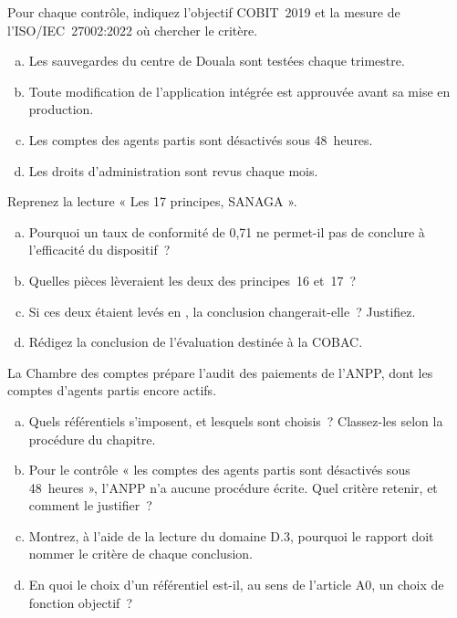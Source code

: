 \bigskip

\begin{boxexo}[title={\ding{45}\quad Exercice~11.1. Trouver le critère \niveaubase}]
Pour chaque contrôle, indiquez l'objectif COBIT~2019 et la mesure de
l'ISO/IEC~27002:2022 où chercher le critère.
\begin{enumerate}[(a)]
    \item Les sauvegardes du centre de Douala sont testées chaque trimestre.
    \item Toute modification de l'application intégrée est approuvée avant
          sa mise en production.
    \item Les comptes des agents partis sont désactivés sous 48~heures.
    \item Les droits d'administration sont revus chaque mois.
\end{enumerate}
\end{boxexo}

\begin{boxexo}[title={\ding{45}\quad Exercice~11.2. Conclure selon le COSO \niveaumoyen}]
Reprenez la lecture « Les 17 principes, SANAGA ».
\begin{enumerate}[(a)]
    \item Pourquoi un taux de conformité de 0,71 ne permet-il pas de
          conclure à l'efficacité du dispositif~?
    \item Quelles pièces lèveraient les deux \NEK{} des principes~16 et~17~?
    \item Si ces deux \NEK{} étaient levés en \OUI{}, la conclusion
          changerait-elle~? Justifiez.
    \item Rédigez la conclusion de l'évaluation destinée à la COBAC.
\end{enumerate}
\end{boxexo}

\begin{boxexo}[title={\ding{45}\quad Exercice~11.3. Choisir les référentiels de l'ANPP \niveauexpert}]
La Chambre des comptes prépare l'audit des paiements de l'ANPP, dont les
comptes d'agents partis encore actifs.
\begin{enumerate}[(a)]
    \item Quels référentiels s'imposent, et lesquels sont choisis~?
          Classez-les selon la procédure du chapitre.
    \item Pour le contrôle « les comptes des agents partis sont désactivés
          sous 48~heures », l'ANPP n'a aucune procédure écrite. Quel critère
          retenir, et comment le justifier~?
    \item Montrez, à l'aide de la lecture du domaine D.3, pourquoi le rapport
          doit nommer le critère de chaque conclusion.
    \item En quoi le choix d'un référentiel est-il, au sens de l'article A0,
          un choix de fonction objectif~?
\end{enumerate}
\end{boxexo}

